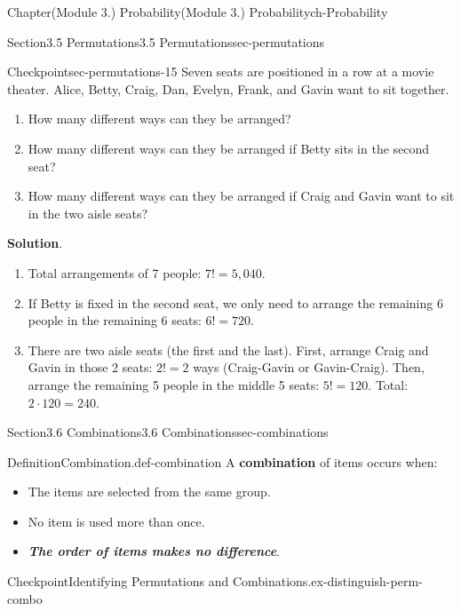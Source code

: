 \documentclass[oneside,10pt,]{book}
\newcommand{\blocktitlefont}{\relax}
\newcommand{\ptxlistdisc}{\raisebox{0.3ex}{\textbullet}}
\newcommand{\alert}[1]{\textbf{\textit{#1}}}
\newcommand{\terminology}[1]{\textbf{#1}}
\begin{document}
\begin{chapterptx}{Chapter}{(Module 3.) Probability}{}{(Module 3.) Probability}{}{}{ch-Probability}
\begin{sectionptx}{Section}{3.5 Permutations}{}{3.5 Permutations}{}{}{sec-permutations}
\begin{inlineexercise}{Checkpoint}{}{sec-permutations-15}
Seven seats are positioned in a row at a movie theater. Alice, Betty, Craig, Dan, Evelyn, Frank, and Gavin want to sit together.%
%
\begin{enumerate}
\item{}How many different ways can they be arranged?%
\item{}How many different ways can they be arranged if Betty sits in the second seat?%
\item{}How many different ways can they be arranged if Craig and Gavin want to sit in the two aisle seats?%
\end{enumerate}
\par\smallskip%
\noindent\textbf{\blocktitlefont Solution}.\hypertarget{sec-permutations-15-2}{}\quad{}%
\begin{enumerate}
\item{}Total arrangements of 7 people: \(7! = 5,040\).%
\item{}If Betty is fixed in the second seat, we only need to arrange the remaining 6 people in the remaining 6 seats: \(6! = 720\).%
\item{}There are two aisle seats (the first and the last). First, arrange Craig and Gavin in those 2 seats: \(2! = 2\) ways (Craig-Gavin or Gavin-Craig). Then, arrange the remaining 5 people in the middle 5 seats: \(5! = 120\). Total: \(2 \cdot 120 = 240\).%
\end{enumerate}
%
\end{inlineexercise}%
\end{sectionptx}
%
%
\typeout{************************************************}
\typeout{************************************************}
%
\begin{sectionptx}{Section}{3.6 Combinations}{}{3.6 Combinations}{}{}{sec-combinations}
\begin{definition}{Definition}{Combination.}{def-combination}%
A \terminology{combination} of items occurs when:%
\begin{itemize}[label=\ptxlistdisc]
\item{}The items are selected from the same group.%
\item{}No item is used more than once.%
\item{}\alert{The order of items makes no difference}.%
\end{itemize}
%
\end{definition}
\begin{inlineexercise}{Checkpoint}{Identifying Permutations and Combinations.}{ex-distinguish-perm-combo}%

\end{inlineexercise}
\end{sectionptx}
\end{chapterptx}
\end{document}
